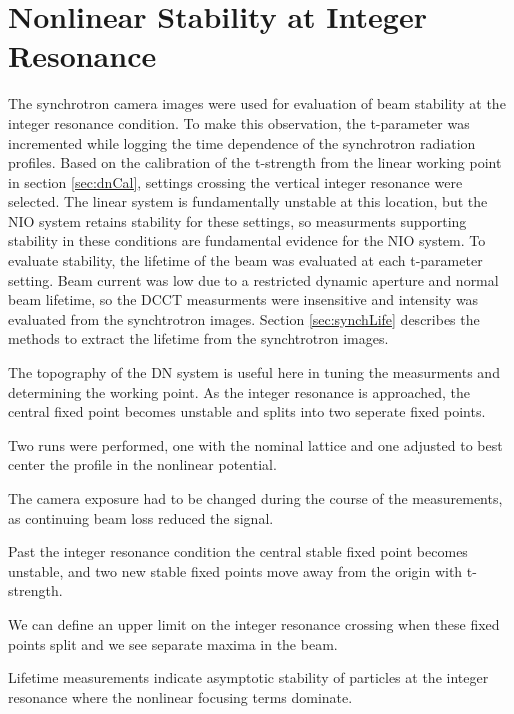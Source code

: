 \section{Nonlinear Stability at Integer Resonance} \label{sec:intCross}
The synchrotron camera images were used for evaluation of beam stability at the integer resonance condition. To make this observation, the t-parameter was incremented while logging the time dependence of the synchrotron radiation profiles. Based on the calibration of the t-strength from the linear working point in section \ref{sec:dnCal}, settings crossing the vertical integer resonance were selected. The linear system is fundamentally unstable at this location, but the NIO system retains stability for these settings, so measurments supporting stability in these conditions are fundamental evidence for the NIO system. To evaluate stability, the lifetime of the beam was evaluated at each t-parameter setting. Beam current was low due to a restricted dynamic aperture and normal beam lifetime, so the DCCT measurments were insensitive and intensity was evaluated from the synchtrotron images. Section \ref{sec:synchLife} describes the methods to extract the lifetime from the synchtrotron images.

The topography of the DN system is useful here in tuning the measurments and determining the working point. As the integer resonance is approached, the central fixed point becomes unstable and splits into two seperate fixed points.

Two runs were performed, one with the nominal lattice and one adjusted to best center the profile in the nonlinear potential.

The camera exposure had to be changed during the course of the measurements, as continuing beam loss reduced the signal.

Past the integer resonance condition the central stable fixed point becomes unstable, and two new stable fixed points move away from the origin with t-strength.

We can define an upper limit on the integer resonance crossing when these fixed points split and we see separate maxima in the beam.

Lifetime measurements indicate asymptotic stability of particles at the integer resonance where the nonlinear focusing terms dominate.
